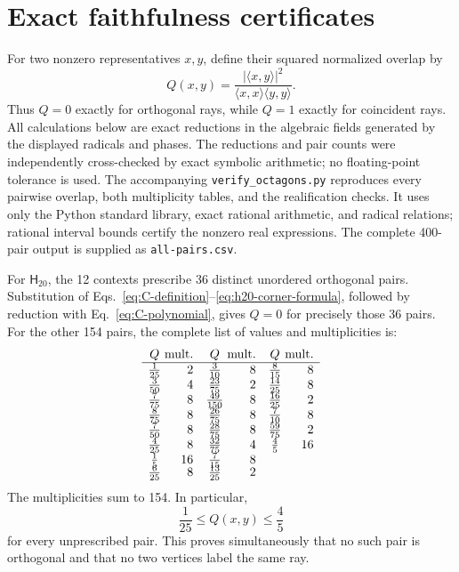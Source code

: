 \documentclass[twocolumn,aps,pra,floatfix,amsmath,amssymb,longbibliography]{revtex4-2}
\theoremstyle{definition}
\theoremstyle{remark}
\newcommand{\Htwenty}{\mathsf H_{20}}
\begin{document}
\appendix

\section{Exact faithfulness certificates}
\label{app:faithfulness}

For two nonzero representatives $x,y$, define their squared normalized
overlap by
\begin{equation}
 Q(x,y)=\frac{|\langle x,y\rangle|^2}
 {\langle x,x\rangle\langle y,y\rangle}.
 \label{eq:Q}
\end{equation}
Thus $Q=0$ exactly for orthogonal rays, while $Q=1$ exactly for
coincident rays.  All calculations below are exact reductions in the
algebraic fields generated by the displayed radicals and phases.  The
reductions and pair counts were independently cross-checked by exact symbolic
arithmetic; no floating-point tolerance is used.
The accompanying \texttt{verify\_octagons.py} reproduces every pairwise
overlap, both multiplicity tables, and the realification checks.  It uses
only the Python standard library, exact rational arithmetic, and radical
relations; rational interval bounds certify the nonzero real expressions.
The complete 400-pair output is supplied as \texttt{all-pairs.csv}.

For $\Htwenty$, the 12 contexts prescribe 36 distinct unordered
orthogonal pairs.  Substitution of
Eqs.~\eqref{eq:C-definition}--\eqref{eq:h20-corner-formula}, followed by
reduction with Eq.~\eqref{eq:C-polynomial}, gives $Q=0$ for precisely
those 36 pairs.  For the other 154 pairs, the complete list of values
and multiplicities is:
\begin{equation}
\begin{array}{c@{\;}r@{\quad}c@{\;}r@{\quad}c@{\;}r}
 Q&\text{mult.}&Q&\text{mult.}&Q&\text{mult.}\\ \hline
 \frac1{25}&2&\frac3{10}&8&\frac8{15}&8\\
 \frac3{50}&4&\frac{23}{75}&2&\frac{14}{25}&8\\
 \frac7{75}&8&\frac{49}{150}&8&\frac{16}{25}&2\\
 \frac8{75}&8&\frac{26}{75}&8&\frac7{10}&8\\
 \frac7{50}&8&\frac{28}{75}&8&\frac{59}{75}&2\\
 \frac4{25}&8&\frac{32}{75}&4&\frac45&16\\
 \frac15&16&\frac7{15}&8&&\\[-2pt]
 \frac6{25}&8&\frac{13}{25}&2&&
\end{array}
\label{eq:H20-Q-table}
\end{equation}
The multiplicities sum to 154.  In particular,
\begin{equation}
 \frac1{25}\le Q(x,y)\le\frac45
 \label{eq:H20-Q-bounds}
\end{equation}
for every unprescribed pair.  This proves simultaneously that no such
pair is orthogonal and that no two vertices label the same ray.
\end{document}
